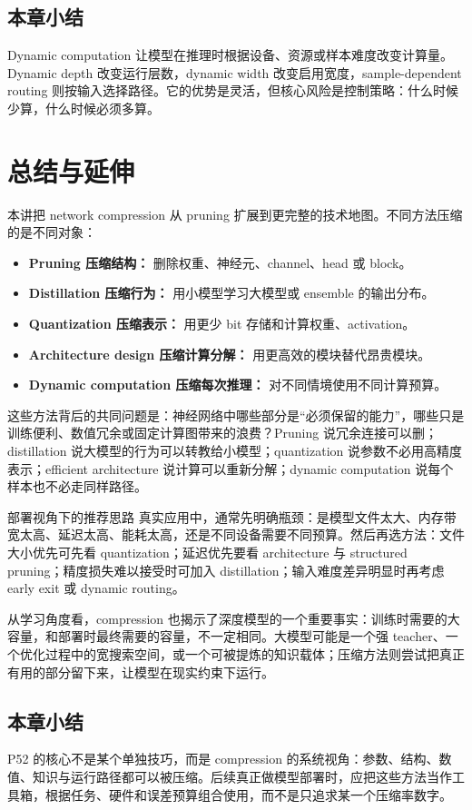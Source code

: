 \documentclass[a4paper]{article}
\begin{document}
\subsection{本章小结}

Dynamic computation 让模型在推理时根据设备、资源或样本难度改变计算量。Dynamic depth 改变运行层数，dynamic width 改变启用宽度，sample-dependent routing 则按输入选择路径。它的优势是灵活，但核心风险是控制策略：什么时候少算，什么时候必须多算。

\section{总结与延伸}

本讲把 network compression 从 pruning 扩展到更完整的技术地图。不同方法压缩的是不同对象：
\begin{itemize}
    \item \textbf{Pruning 压缩结构：} 删除权重、神经元、channel、head 或 block。
    \item \textbf{Distillation 压缩行为：} 用小模型学习大模型或 ensemble 的输出分布。
    \item \textbf{Quantization 压缩表示：} 用更少 bit 存储和计算权重、activation。
    \item \textbf{Architecture design 压缩计算分解：} 用更高效的模块替代昂贵模块。
    \item \textbf{Dynamic computation 压缩每次推理：} 对不同情境使用不同计算预算。
\end{itemize}

这些方法背后的共同问题是：神经网络中哪些部分是“必须保留的能力”，哪些只是训练便利、数值冗余或固定计算图带来的浪费？Pruning 说冗余连接可以删；distillation 说大模型的行为可以转教给小模型；quantization 说参数不必用高精度表示；efficient architecture 说计算可以重新分解；dynamic computation 说每个样本也不必走同样路径。

\begin{importantbox}{部署视角下的推荐思路}
    真实应用中，通常先明确瓶颈：是模型文件太大、内存带宽太高、延迟太高、能耗太高，还是不同设备需要不同预算。然后再选方法：文件大小优先可先看 quantization；延迟优先要看 architecture 与 structured pruning；精度损失难以接受时可加入 distillation；输入难度差异明显时再考虑 early exit 或 dynamic routing。
\end{importantbox}

从学习角度看，compression 也揭示了深度模型的一个重要事实：训练时需要的大容量，和部署时最终需要的容量，不一定相同。大模型可能是一个强 teacher、一个优化过程中的宽搜索空间，或一个可被提炼的知识载体；压缩方法则尝试把真正有用的部分留下来，让模型在现实约束下运行。

\subsection{本章小结}

P52 的核心不是某个单独技巧，而是 compression 的系统视角：参数、结构、数值、知识与运行路径都可以被压缩。后续真正做模型部署时，应把这些方法当作工具箱，根据任务、硬件和误差预算组合使用，而不是只追求某一个压缩率数字。
\end{document}
